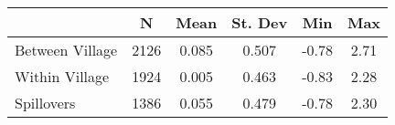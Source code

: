 \begin{tabular}{l*{5}{c}}\hline&\multicolumn{1}{c}{N}&\multicolumn{1}{c}{Mean}&\multicolumn{1}{c}{St. Dev}&\multicolumn{1}{c}{Min}&\multicolumn{1}{c}{Max}\\ \hline 
Between Village & 2126 & 0.085 & 0.507 & -0.78 & 2.71 \\
Within Village & 1924 & 0.005 & 0.463 & -0.83 & 2.28 \\
Spillovers & 1386 & 0.055 & 0.479 & -0.78 & 2.30 \\
\hline \end{tabular}

